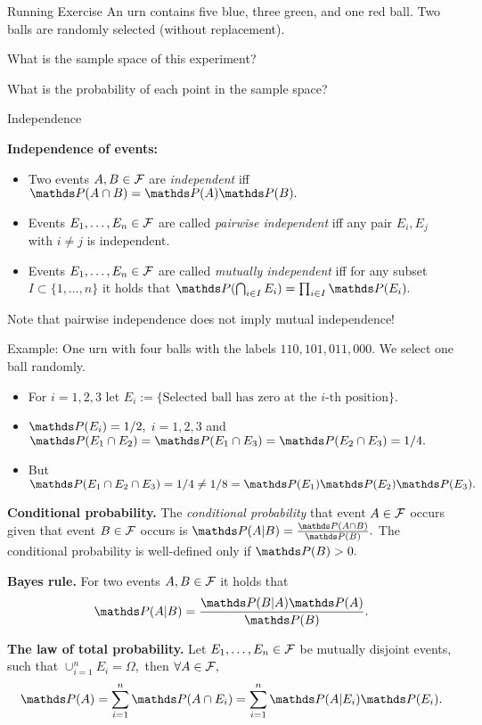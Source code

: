 \begin{vbframe}{Running Exercise}  
An urn contains five blue, three green, and one red ball. Two balls are randomly selected (without replacement).

\lz



What is the sample space of this experiment?


\lz

\lz
\lz
\lz

What is the probability of each point in the sample space?



\end{vbframe}

\begin{vbframe}{Independence}  


\textbf{Independence of events:} 
%		
\begin{itemize}
	\item 		Two events $A,B\in \mathcal{F}$ are \emph{independent} iff $\P(A \cap B)=\P(A)\P(B).$
	\item Events $E_1,\ldots,E_n \in \mathcal{F}$ are called \emph{pairwise independent} iff any pair $E_i,E_j$ with $i \neq j$ is independent.
	\item Events $E_1,\ldots,E_n \in \mathcal{F}$ are called \emph{mutually independent} iff for any  subset $I \subset \{1,\ldots,n\}$ it holds that  $\P(\bigcap_{i \in I} E_i )= \prod_{i \in I}\P(E_i).$
\end{itemize}
%		
Note that pairwise independence does not imply mutual independence! 

\lz

Example: One urn with four balls with the labels $110,101,011,000.$ We select one ball randomly.
\begin{itemize}
%	
	\item For $i=1,2,3$ let $E_i:=\{ \mbox{Selected ball has zero at the $i$-th position}  \}.$ 
%	
	\item $\P(E_i) = 1/2,$ $i=1,2,3$ and $\P(E_1 \cap E_2) = \P(E_1 \cap E_3) = \P(E_2 \cap E_3) =1/4.$
%	
	\item But $\P(E_1 \cap E_2 \cap E_3) = 1/4 \neq 1/8 = \P(E_1)\P(E_2)\P(E_3).$
%	
\end{itemize}
 


\framebreak

%
\textbf{Conditional probability.} The \emph{conditional probability} that event $A\in \mathcal{F}$ occurs given that event $B\in\mathcal{F}$ occurs is $\P(A|B)= \frac{\P(A\cap B)}{\P(B)}.$ The conditional probability is well-defined only if $\P(B) > 0.$


%	
\textbf{Bayes rule.} For two events $A,B\in \mathcal{F}$  it holds that $$\P(A|B)=\frac{\P(B|A) \P(A)}{\P(B)}.$$
%
\lz 

%
\textbf{The law of total probability.} Let $E_1,\ldots,E_n \in \mathcal{F}$  be mutually disjoint events, such that $\cup_{i=1}^n E_i = \Omega,$ then $ \forall A\in \mathcal{F},$ {  $$\P(A) = \sum_{i=1}^n \P(A \cap E_i) = \sum_{i=1}^n \P(A | E_i) \P(E_i).$$}
%	

\end{vbframe}


